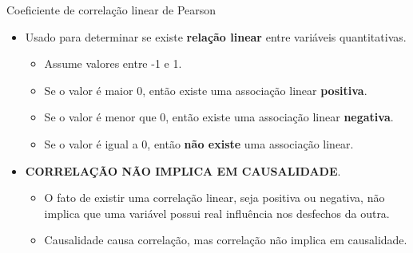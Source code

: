 \documentclass[
  ignorenonframetext,
  serif,
  professionalfont,
  usenames,
  dvipsnames,
  aspectratio = 169]{beamer}
\providecommand{\tightlist}{%
  \setlength{\itemsep}{0pt}\setlength{\parskip}{0pt}}
\renewcommand{\tightlist}{%
  \setlength{\itemsep}{0\baselineskip}
  \setlength{\parskip}{0.25\baselineskip}
}
\def\beginAHalfColumn{\begin{minipage}{0.49\textwidth}}%
\def\endColumns{\end{minipage}}%
\begin{document}
\begin{frame}{Coeficiente de correlação linear de Pearson}
\label{coeficiente-de-correlauxe7uxe3o-linear-de-pearson}
\beginAHalfColumn

\begin{itemize}
\tightlist
\item
  Usado para determinar se existe \textbf{relação linear} entre
  variáveis quantitativas.

  \begin{itemize}
  \tightlist
  \item
    Assume valores entre -1 e 1.
  \item
    Se o valor é maior 0, então existe uma associação linear
    \textbf{positiva}.
  \item
    Se o valor é menor que 0, então existe uma associação linear
    \textbf{negativa}.
  \item
    Se o valor é igual a 0, então \textbf{não existe} uma associação
    linear.
  \end{itemize}
\end{itemize}

\endColumns
\beginAHalfColumn

\begin{itemize}
\tightlist
\item
  \textbf{CORRELAÇÃO NÃO IMPLICA EM CAUSALIDADE}.

  \begin{itemize}
  \tightlist
  \item
    O fato de existir uma correlação linear, seja positiva ou negativa,
    não implica que uma variável possui real influência nos desfechos da
    outra.
  \item
    Causalidade causa correlação, mas correlação não implica em
    causalidade.
  \end{itemize}
\end{itemize}

\endColumns
\end{frame}
\end{document}
